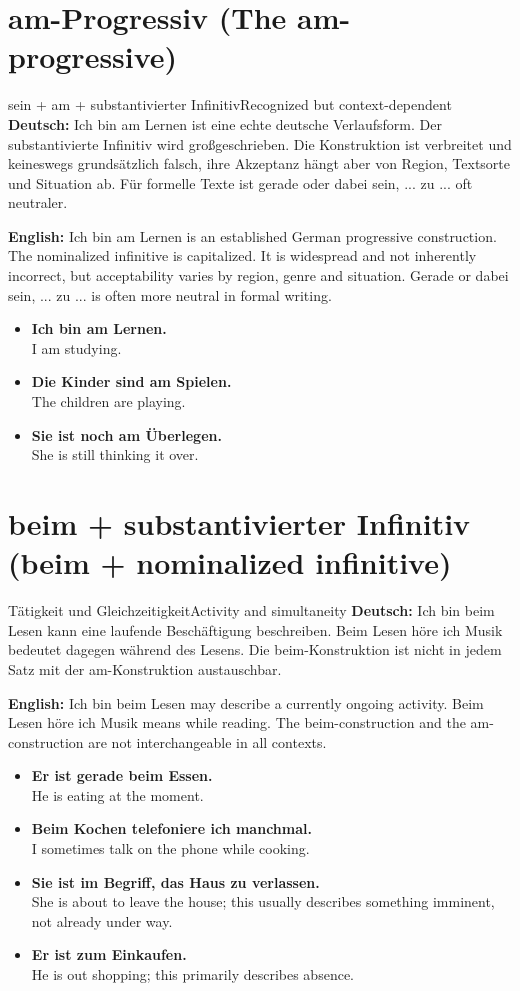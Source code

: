 \documentclass[a4paper,11pt]{article}
\newcommand{\GermanText}[1]{\textbf{Deutsch: }#1\par}
\newcommand{\EnglishText}[1]{{\small\color{SoftGray}\textbf{English: }#1\par}}
\newcommand{\ExampleItem}[2]{\item \textbf{#1}\\{\small\color{SoftGray}#2}}
\begin{document}
\section{am-Progressiv \textnormal{(The am-progressive)}}
\begin{grammarentry}{sein + am + substantivierter Infinitiv}{Recognized but context-dependent}
\GermanText{Ich bin am Lernen ist eine echte deutsche Verlaufsform. Der substantivierte Infinitiv wird großgeschrieben. Die Konstruktion ist verbreitet und keineswegs grundsätzlich falsch, ihre Akzeptanz hängt aber von Region, Textsorte und Situation ab. Für formelle Texte ist gerade oder dabei sein, ... zu ... oft neutraler.}
\EnglishText{Ich bin am Lernen is an established German progressive construction. The nominalized infinitive is capitalized. It is widespread and not inherently incorrect, but acceptability varies by region, genre and situation. Gerade or dabei sein, ... zu ... is often more neutral in formal writing.}
\end{grammarentry}
\begin{exbox}
\begin{itemize}
\ExampleItem{Ich bin am Lernen.}{I am studying.}
\ExampleItem{Die Kinder sind am Spielen.}{The children are playing.}
\ExampleItem{Sie ist noch am Überlegen.}{She is still thinking it over.}
\end{itemize}
\end{exbox}

\section{beim + substantivierter Infinitiv \textnormal{(beim + nominalized infinitive)}}
\begin{grammarentry}{Tätigkeit und Gleichzeitigkeit}{Activity and simultaneity}
\GermanText{Ich bin beim Lesen kann eine laufende Beschäftigung beschreiben. Beim Lesen höre ich Musik bedeutet dagegen während des Lesens. Die beim-Konstruktion ist nicht in jedem Satz mit der am-Konstruktion austauschbar.}
\EnglishText{Ich bin beim Lesen may describe a currently ongoing activity. Beim Lesen höre ich Musik means while reading. The beim-construction and the am-construction are not interchangeable in all contexts.}
\end{grammarentry}
\begin{exbox}
\begin{itemize}
\ExampleItem{Er ist gerade beim Essen.}{He is eating at the moment.}
\ExampleItem{Beim Kochen telefoniere ich manchmal.}{I sometimes talk on the phone while cooking.}
\ExampleItem{Sie ist im Begriff, das Haus zu verlassen.}{She is about to leave the house; this usually describes something imminent, not already under way.}
\ExampleItem{Er ist zum Einkaufen.}{He is out shopping; this primarily describes absence.}
\end{itemize}
\end{exbox}
\end{document}
